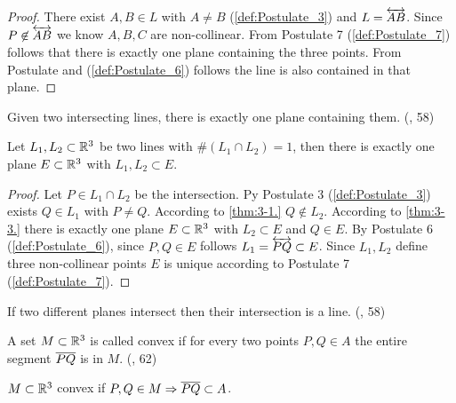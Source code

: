 \begin{proof}
  There exist $A,B \in L$ with $A\ne B$ (\ref{def:Postulate_3}) and $L=\overleftrightarrow{AB}$.
  Since $P \not\in \overleftrightarrow{AB}$ we know $A,B,C$ are non-collinear.
  From Postulate 7 (\ref{def:Postulate_7}) follows that there is exactly one plane containing the three points.
  From Postulate and (\ref{def:Postulate_6}) follows the line is also contained in that plane.

\end{proof}

\begin{theorem}[3-4.]\label{thm:3-4.}
  Given two intersecting lines, there is exactly one plane containing them.
  (\cite{SMSGGeometry}, 58)

  Let $L_1, L_2\subset \mathbb{R}^3$ be two lines with $\#(L_1\cap L_2)=1$, then there is exactly one plane $E\subset \mathbb{R}^3$ with $L_1,L_2 \subset E$.
\end{theorem}

\begin{proof}
  Let $P \in L_1\cap L_2$ be the intersection.
  Py Postulate 3 (\ref{def:Postulate_3}) exists $Q \in L_1$ with $P \ne Q$.
  According to \ref{thm:3-1.} $Q \not\in L_2$.
  According to \ref{thm:3-3.} there is exactly one plane $E \subset \mathbb{R}^3$ with $L_2 \subset E$ and $Q \in E$.
  By Postulate 6 (\ref{def:Postulate_6}), since $P,Q \in E$ follows $L_1=\overleftrightarrow{PQ} \subset E$.
  Since $L_1, L_2$ define three non-collinear points $E$ is unique according to Postulate 7 (\ref{def:Postulate_7}).
\end{proof}

\begin{definition}[Postulate 8]\label{def:Postulate_8}
  If two different planes intersect then their intersection is a line.
  (\cite{SMSGGeometry}, 58)

\end{definition}

\begin{definition}\label{def:Convex_Sets}
  A set $M \subset \mathbb{R}^3$ is called convex if for every two points $P,Q \in A$ the entire segment $\overline{PQ}$ is in $M$.
  (\cite{SMSGGeometry}, 62)

  $M\subset \mathbb{R}^3$ convex if $P,Q \in M \Rightarrow \overline{PQ}\subset A$.
\end{definition}


